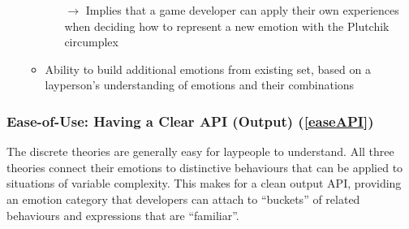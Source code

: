 \begin{itemize}
\begin{itemize}
\begin{itemize}
            \item [$\rightarrow$] Implies that a game developer can apply their
            own experiences when deciding how to represent a new emotion with
            the Plutchik circumplex
        \end{itemize}

        \item Ability to build additional emotions from existing set, based on
        a layperson's understanding of emotions and their combinations
    \end{itemize}
\end{itemize}


\subsubsection{Ease-of-Use: Having a Clear API (Output)  (\ref{easeAPI})}
The discrete theories are generally easy for laypeople to understand. All three
theories connect their emotions to distinctive behaviours that can be applied
to situations of variable complexity. This makes for a clean output API,
providing an emotion category that developers can attach to ``buckets'' of
related behaviours and expressions that are ``familiar''.

